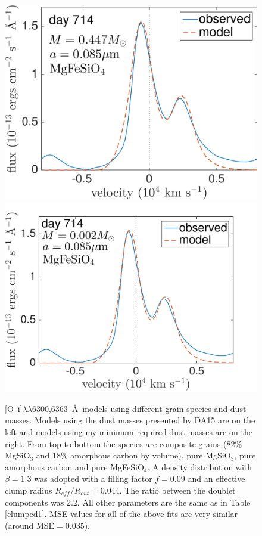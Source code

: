 \begin{figure}
\includegraphics[trim =-25 0 0 0,clip=true,scale=0.33]{chapters/chapter5/images/silicates_take2/OI/MgFeSiO4_Dwek.pdf}
\hspace{3mm}
\includegraphics[trim =0 0 0 -25,clip=true,scale=0.33]{chapters/chapter5/images/silicates_take2/OI/MgFeSiO4_bestfit.pdf}

\caption{[O~{\sc i}]$\lambda\lambda$6300,6363~\AA\ models using different grain 
species and dust masses.  Models using the dust masses presented by DA15 
are on the left and models using my minimum required dust masses are on 
the right.  From top to bottom the species are composite grains (82\% 
MgSiO$_3$ and 18\% amorphous carbon by volume), pure MgSiO$_3$, pure 
amorphous carbon and pure MgFeSiO$_4$.  A density distribution with 
$\beta=1.3$ was adopted with a filling factor $f=0.09$ and an effective 
clump radius $R_{eff}/R_{out}=0.044$. The ratio between the 
doublet components was 2.2. All other parameters are the same as in 
Table \ref{clumped1}.  MSE values for all of the above fits are very similar (around MSE$=0.035$).}
\label{Dwek_models_OI}
\end{figure}

